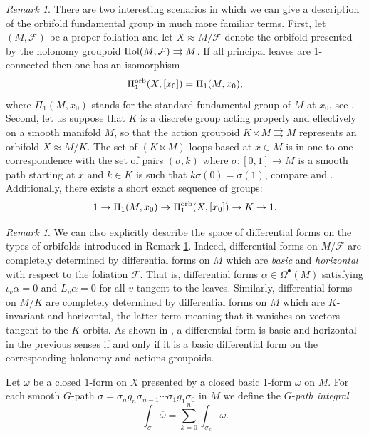 \documentclass[
  a4paper, 
  reqno, 
  oneside, 
  12pt
]{amsart}
\theoremstyle{definition}
\theoremstyle{remark}
\newtheorem{remark}[theorem]{Remark}
\newcommand{\rr}{\rightrightarrows}
\begin{document}
\begin{remark}\label{remark1}
There are two interesting scenarios in which we can give a description of the orbifold fundamental group in much more familiar terms. First, let $(M,\mathcal{F})$ be a proper foliation and let $X\approx M/\mathcal{F}$ denote the orbifold presented by the holonomy groupoid $\textnormal{Hol}(M,\mathcal{F})\rr M$. If all principal leaves are 1-connected then one has an isomorphism
$$\Pi_1^\textnormal{orb}(X,[x_0])=\Pi_1(M,x_0),$$
where $\Pi_1(M,x_0)$ stands for the standard fundamental group of $M$ at $x_0$, see \cite[Lem. 6.1]{CFMT}. Second, let us suppose that $K$ is a discrete group acting properly and effectively on a smooth manifold $M$, so that the action groupoid $K\ltimes M\rr M$ represents an orbifold $X\approx M/K$. The set of $(K\ltimes M)$-loops based at $x\in M$ is in one-to-one correspondence with the set of pairs $(\sigma,k)$ where $\sigma:[0,1]\to M$ is a smooth path starting at $x$ and $k\in K$ is such that $k\sigma(0)=\sigma(1)$, compare \cite[p. 608]{BH} and \cite[p. 192]{MoMr}. Additionally, there exists a short exact sequence of groups:
\begin{equation*}
	1\to \Pi_1(M,x_0)\to \Pi_1^\textnormal{orb}(X,[x_0])\to K\to 1.
\end{equation*}
\end{remark}

\begin{remark}\label{remark2}
We can also explicitly describe the space of differential forms on the types of orbifolds introduced in Remark \ref{remark1}. Indeed, differential forms on $M/\mathcal{F}$ are completely determined by differential forms on $M$ which are \emph{basic} and \emph{horizontal} with respect to the foliation $\mathcal{F}$. That is, differential forms $\alpha\in \Omega^\bullet (M)$ satisfying $\iota_v\alpha=0$ and $L_v\alpha=0$ for all $v$ tangent to the leaves. Similarly, differential forms on $M/K$ are completely determined by differential forms on $M$ which are $K$-invariant and horizontal, the latter term meaning that it vanishes on vectors tangent to the $K$-orbits. As shown in \cite{Wa}, a differential form is basic and horizontal in the previous senses if and only if it is a basic differential form on the corresponding holonomy and actions groupoids.
\end{remark}

Let $\overline{\omega}$ be a closed 1-form on $X$ presented by a closed basic 1-form $\omega$ on $M$. For each smooth $G$-path $\sigma=\sigma_ng_n\sigma_{n-1}\cdots \sigma_1g_1\sigma_0$ in $M$ we define the $G$-\emph{path integral}
$$\int_{\sigma}\overline{\omega}=\sum_{k=0}^{n}\int_{\sigma_k}\omega.$$
\end{document}
